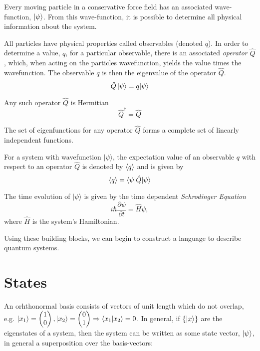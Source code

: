 \begin{postulate}
\item \label{postulate:conservative_force_field} 
    Every moving particle in a conservative force field has an associated wave-function, $\ket{\psi}$. 
    From this wave-function, it is possible to determine all physical information about the system. 
\item \label{postulate:eigenvalues} 
    All particles have physical properties called observables (denoted $q$). 
    In order to determine a value, $q$, for a particular observable, there is an associated \emph{operator} $\hat{Q}$, which, 
        when acting on the particles wavefunction, yields the value times the wavefunction. 
    The observable $q$ is then the eigenvalue of the operator $\hat{Q}$.
    \begin{equation}
    \hat{Q} \ket{\psi} = q | \psi \rangle
    \end{equation}
\item \label{postulate:hermiticity}
    Any such operator  $\hat{Q}$ is Hermitian
    \begin{equation}
        \hat{Q}^\dag = \hat{Q}
    \end{equation}
\item \label{postulate:eigenfunction}
    The set of eigenfunctions for any operator $\hat{Q}$ forms a complete set of linearly independent functions.
\item \label{postulate:expectation_values}
    For a system with wavefunction $ | \psi \rangle$, the expectation value of an observable $q$  with respect to an operator $\hat{Q}$ is  denoted by $\langle q \rangle$ and is given by 
    \begin{equation}
    \langle q \rangle = \langle \psi | \hat{Q} | \psi \rangle
    \end{equation}
\item \label{postulate:schrodinger_eqn}
    The time evolution of $ | \psi \rangle$ is given by the time dependent \emph{Schrodinger Equation}
    \begin{equation}
    i \hbar \frac{\partial \psi}{\partial t} = \hat{H} \psi,
    \end{equation}
    where $\hat{H}$ is the system's Hamiltonian.
\end{postulate}
 
Using these building blocks, we can begin to construct a language to describe quantum systems. 

\section{States}\label{sec:states}
An orhthonormal basis consists of vectors of unit length which do not overlap, 
    e.g. $\ket{x_1} = \left(\begin{matrix}1 \\ 0 \end{matrix}\right), \ket{x_2} = \left(\begin{matrix}0 \\ 1\end{matrix}\right) \Rightarrow \braket{x_1 | x_2} = 0$. 
In general, if $ \{ \ket{x} \} $ are the eigenstates of a system, then the system can be written as some state vector, $\ket{\psi}$, 
    in general a superposition over the basis-vectors: 

